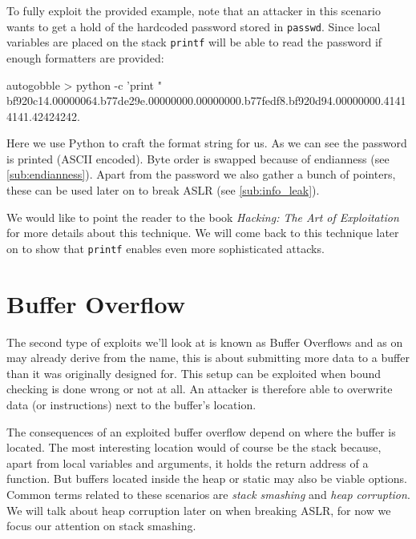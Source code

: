 \documentclass[article]{uibk}
\begin{document}
To fully exploit the provided example, note that an attacker in this scenario
wants to get a hold of the hardcoded password stored in \texttt{passwd}. Since
local variables are placed on the stack \texttt{printf} will be able to read
the password if enough formatters are provided:

\begin{pre*} {autogobble}
    > python -c 'print "%
    bf920c14.00000064.b77de29e.00000000.00000000.b77fedf8.bf920d94.00000000.41414141.42424242.
\end{pre*}

Here we use Python to craft the format string for us. As we can see the
password is printed (ASCII encoded). Byte order is swapped because of
endianness (see \cref{sub:endianness}). Apart from the password we also gather
a bunch of pointers, these can be used later on to break ASLR (see
\cref{sub:info_leak}).

We would like to point the reader to the book \textit{Hacking: The Art of
Exploitation} \cite[pp.~167]{art_of_exploitation} for more details about this
technique. We will come back to this technique later on to show that
\texttt{printf} enables even more sophisticated attacks.

\section{Buffer Overflow}

The second type of exploits we'll look at is known as Buffer Overflows and as
on may already derive from the name, this is about submitting more data to a
buffer than it was originally designed for. This setup can be exploited when
bound checking is done wrong or not at all. An attacker is therefore able to
overwrite data (or instructions) next to the buffer's location.

The consequences of an exploited buffer overflow depend on where the buffer is
located. The most interesting location would of course be the stack because,
apart from local variables and arguments, it holds the return address of a
function. But buffers located inside the heap or static may also be viable
options. Common terms related to these scenarios are \textit{stack smashing}
and \textit{heap corruption}. We will talk about heap corruption later on when
breaking ASLR, for now we focus our attention on stack smashing.
\end{document}
